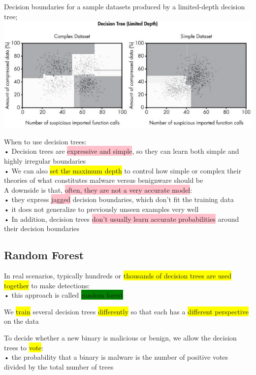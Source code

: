 \documentclass[]{project_plan}
\begin{document}
Decision boundaries for a sample datasets produced by a limited-depth decision tree;\\
\includegraphics[width=.8\linewidth]{ml77.png}

When to use decision trees:\\
• Decision trees are \colorbox{pink}{expressive and simple}, so they can learn both simple and highly irregular
boundaries\\
• We can also \colorbox{yellow}{set the maximum depth} to control how simple or complex their theories of what
constitutes malware versus benignware should be\\

A downside is that, \colorbox{pink}{often, they are not a very accurate model}:\\
• they express \colorbox{pink}{jagged} decision boundaries, which don’t fit the training data\\
• it does not generalize to previously unseen examples very well\\
• In addition, decision trees \colorbox{pink}{don’t usually learn accurate probabilities} around their decision
boundaries

\subsection{Random Forest}

In real scenarios, typically hundreds or \colorbox{yellow}{thousands of decision trees are used together} to make
detections:\\
• this approach is called \colorbox{green}{random forest}

We \colorbox{yellow}{train} several decision trees \colorbox{yellow}{differently} so that each has a \colorbox{yellow}{different perspective} on the
data

To decide whether a new binary is malicious or benign, we allow the decision trees to \colorbox{yellow}{vote}:\\
• the probability that a binary is malware is the number of positive votes divided by the total number of trees
\end{document}
